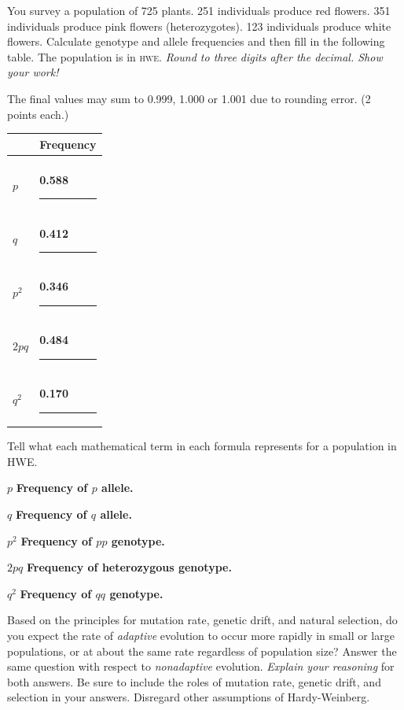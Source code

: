 \question[10]
You survey a population of 725 plants. 251 individuals produce red flowers. 351 individuals produce pink flowers (heterozygotes). 123 individuals produce white flowers. Calculate genotype and allele frequencies and then fill in the following table. The population is in \textsc{hwe}. \emph{Round to three digits after the decimal. Show your work!}

 The final values may sum to 0.999, 1.000 or 1.001 due to rounding error. (2 points each.)

\begin{tabular}{lC{1.1in}}
\toprule
&	Frequency \\
\midrule
 & \\[0.5em]
$p$		& \ifprintanswers \textbf{0.588} \else \rule{1in}{0.4pt} \fi\\[2em]
$q$		& \ifprintanswers \textbf{0.412} \else \rule{1in}{0.4pt} \fi\\[2em]
$p^2$	& \ifprintanswers \textbf{0.346} \else \rule{1in}{0.4pt} \fi\\[2em]
$2pq$	& \ifprintanswers \textbf{0.484} \else \rule{1in}{0.4pt} \fi\\[2em]
$q^2$	& \ifprintanswers \textbf{0.170} \else \rule{1in}{0.4pt} \fi\\
\bottomrule
\end{tabular}


\question[5]
Tell what each mathematical term in each formula represents for a population in HWE.

\vspace{0.5cm}

$p$ \quad\ifprintanswers\textbf{Frequency of $p$ allele.}\fi \vspace{1cm}

$q$ \quad\ifprintanswers\textbf{Frequency of $q$ allele.}\fi\vspace{1cm}

$p^2$ \quad\ifprintanswers\textbf{Frequency of $pp$ genotype.}\fi\vspace{1cm}

$2pq$ \quad\ifprintanswers\textbf{Frequency of heterozygous genotype.}\fi\vspace{1cm}

$q^2$ \quad\ifprintanswers\textbf{Frequency of $qq$ genotype.}\fi{}


\question[20]
Based on the principles for mutation rate, genetic drift, and natural selection, do you expect the rate of \emph{adaptive} evolution to occur more rapidly in small or large populations, or at about the same rate regardless of population size? Answer the same question with respect to \emph{nonadaptive} evolution. \emph{Explain your reasoning} for both answers. Be sure to include the roles of mutation rate, genetic drift, and selection in your answers. Disregard other assumptions of Hardy-Weinberg.

